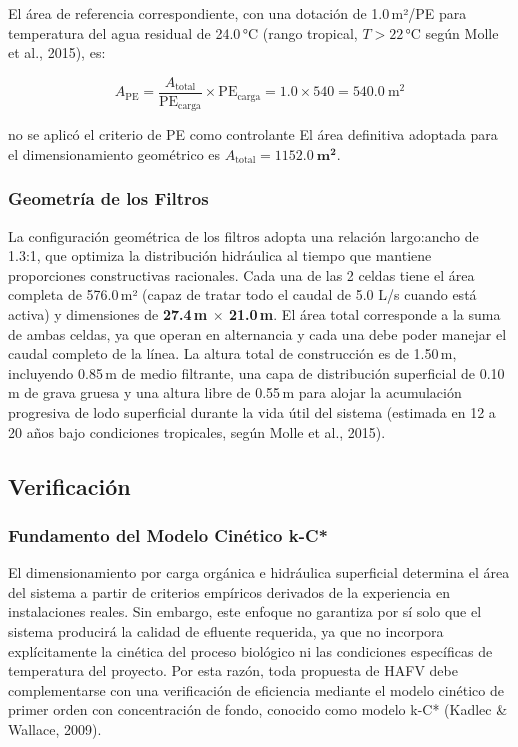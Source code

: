 \documentclass[12pt,a4paper]{article}
\newcommand{\captionequation}[1]{}
\begin{document}
El área de referencia correspondiente, con una dotación de 1.0\,m²/PE para temperatura del agua residual de 24.0\,°C (rango tropical, $T > 22$\,°C según Molle et al., 2015), es:

\begin{equation}
A_\text{PE} = \frac{A_\text{total}}{\text{PE}_\text{carga}} \times \text{PE}_\text{carga} = 1.0 \times 540 = 540.0\ \text{m}^2
\end{equation}
\captionequation{Área de referencia por criterio de habitante equivalente}

no se aplicó el criterio de PE como controlante El área definitiva adoptada para el dimensionamiento geométrico es $A_\text{total} = \mathbf{1152.0\ \text{m}^2}$.

\subsubsection*{Geometría de los Filtros}

La configuración geométrica de los filtros adopta una relación largo:ancho de 1.3:1, que optimiza la distribución hidráulica al tiempo que mantiene proporciones constructivas racionales. Cada una de las 2 celdas tiene el área completa de 576.0\,m² (capaz de tratar todo el caudal de 5.0 L/s cuando está activa) y dimensiones de \textbf{27.4\,m $\times$ 21.0\,m}. El área total corresponde a la suma de ambas celdas, ya que operan en alternancia y cada una debe poder manejar el caudal completo de la línea. La altura total de construcción es de 1.50\,m, incluyendo 0.85\,m de medio filtrante, una capa de distribución superficial de 0.10\,m de grava gruesa y una altura libre de 0.55\,m para alojar la acumulación progresiva de lodo superficial durante la vida útil del sistema (estimada en 12 a 20 años bajo condiciones tropicales, según Molle et al., 2015).


\subsection{Verificación}

\subsubsection*{Fundamento del Modelo Cinético k-C*}

El dimensionamiento por carga orgánica e hidráulica superficial determina el área del sistema a partir de criterios empíricos derivados de la experiencia en instalaciones reales. Sin embargo, este enfoque no garantiza por sí solo que el sistema producirá la calidad de efluente requerida, ya que no incorpora explícitamente la cinética del proceso biológico ni las condiciones específicas de temperatura del proyecto. Por esta razón, toda propuesta de HAFV debe complementarse con una verificación de eficiencia mediante el modelo cinético de primer orden con concentración de fondo, conocido como modelo k-C* (Kadlec \& Wallace, 2009).
\end{document}
